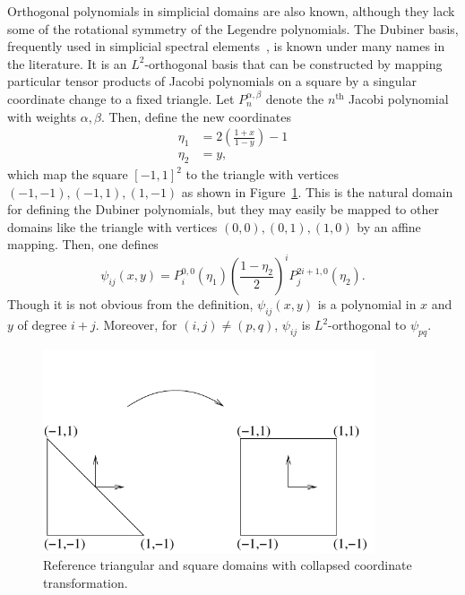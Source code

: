 Orthogonal polynomials in simplicial domains are also known, although
they lack some of the rotational symmetry of the Legendre polynomials.
The Dubiner basis, frequently used in simplicial spectral
elements~\citep{Dubiner1991}, is known under many names in the literature.  It is
an \( L^2 \)-orthogonal basis that can be constructed by mapping particular
tensor products of Jacobi polynomials on a square by a singular
coordinate change to a fixed triangle.
Let \( P^{\alpha,\beta}_n \) denote the \( n^\mathrm{th} \) Jacobi
polynomial with weights \( \alpha, \beta \).  Then, define the
new coordinates
\begin{equation}
\label{eq:dubcoord}
\begin{split}
\eta_1 & = 2\left(\frac{1+x}{1-y}\right)-1 \\
\eta_2 & = y,
\end{split}
\end{equation}
which map the square \( [-1,1]^2 \) to the triangle with
vertices \( (-1,-1),(-1,1),(1,-1) \) as shown in Figure~\ref{fig:tricoord}.  This
is the natural domain for defining the Dubiner polynomials, but they
may easily be mapped to other domains like the triangle with
vertices
\( (0,0) , (0,1) , (1,0) \) by an affine mapping.
Then, one defines
\begin{equation}
\psi_{ij}(x,y) = P_i^{0,0}(\eta_1) \left( \frac{1-\eta_2}{2}
\right)^i P_j^{2i+1,0}(\eta_2).
\end{equation}
Though it is not obvious from the definition, \( \psi_{ij}(x,y) \) is
a polynomial in \( x \) and \( y \) of degree \( i + j \).  Moreover,
for \( (i,j) \neq (p,q) \), \( \psi_{ij} \) is \( L^2 \)-orthogonal to \(
\psi_{pq} \).

\begin{figure}
\begin{center}
\includegraphics[height=6cm]{chapters/kirby-1/pdf/tricoord.pdf} 
\end{center}
\caption{Reference triangular and square domains with collapsed
  coordinate transformation.}
\label{fig:tricoord}
\end{figure}


